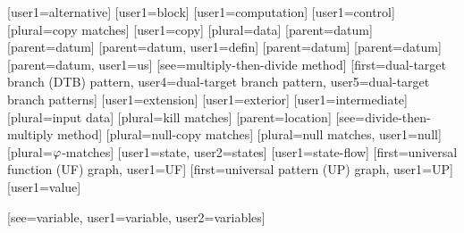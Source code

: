 [user1={alternative}]
[user1={block}]
[user1={computation}]
[user1={control}]
[plural={copy matches}]
[user1={copy}]
[plural={data}]
[parent={datum}]
[parent={datum}]
[parent={datum}, user1={defin}]
[parent={datum}]
[parent={datum}]
[parent={datum}, user1={us}]
[see={multiply-then-divide method}]
%
        [first={dual-target branch (DTB) pattern},
         user4={dual-target branch pattern},
         user5={dual-target branch patterns}]
[user1={extension}]
[user1={exterior}]
[user1={intermediate}]
[plural={input data}]
[plural={kill matches}]
[parent={location}]
[see={divide-then-multiply method}]
[plural={null-copy matches}]
[plural={null matches}, user1={null}]
[plural={{}$\varphi$-matches}]
[user1={state}, user2={states}]
[user1={state-flow}]
[first={universal function (UF) graph}, user1={UF}]
[first={universal pattern (UP) graph}, user1={UP}]
[user1={value}]



[see={variable}, user1={variable}, user2={variables}]

